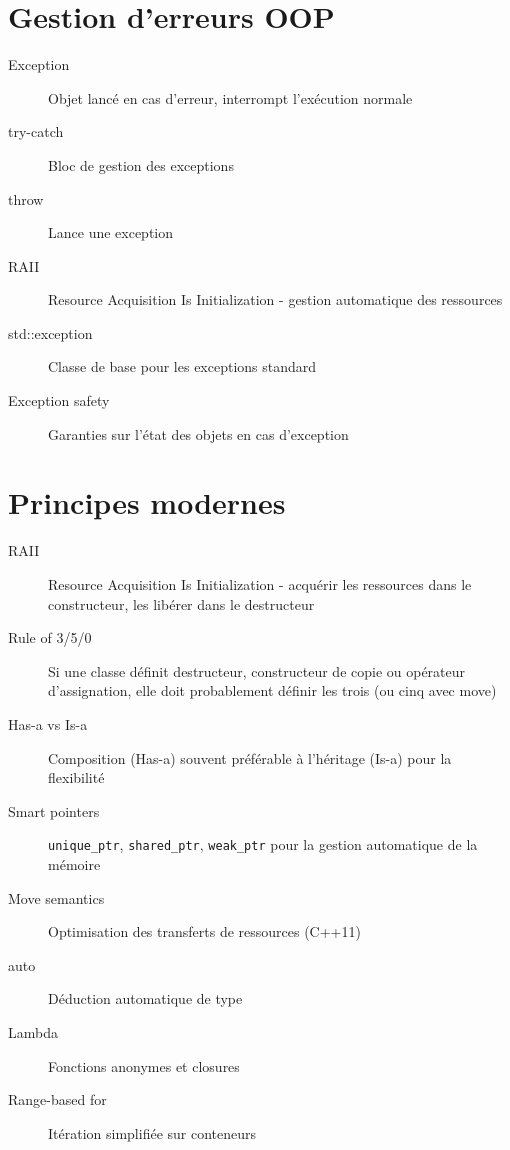 \documentclass{article}
\begin{document}
\begin{multicols*}{3}
\section*{Gestion d'erreurs OOP}
\begin{description}
\item[Exception] Objet lancé en cas d'erreur, interrompt l'exécution normale
\item[try-catch] Bloc de gestion des exceptions
\item[throw] Lance une exception
\item[RAII] Resource Acquisition Is Initialization - gestion automatique des ressources
\item[std::exception] Classe de base pour les exceptions standard
\item[Exception safety] Garanties sur l'état des objets en cas d'exception
\end{description}

\section*{Principes modernes}
\begin{description}
\item[RAII] Resource Acquisition Is Initialization - acquérir les ressources dans le constructeur, les libérer dans le destructeur
\item[Rule of 3/5/0] Si une classe définit destructeur, constructeur de copie ou opérateur d'assignation, elle doit probablement définir les trois (ou cinq avec move)
\item[Has-a vs Is-a] Composition (Has-a) souvent préférable à l'héritage (Is-a) pour la flexibilité
\item[Smart pointers] \texttt{unique\_ptr}, \texttt{shared\_ptr}, \texttt{weak\_ptr} pour la gestion automatique de la mémoire
\item[Move semantics] Optimisation des transferts de ressources (C++11)
\item[auto] Déduction automatique de type
\item[Lambda] Fonctions anonymes et closures
\item[Range-based for] Itération simplifiée sur conteneurs
\end{description}


\end{multicols*}
\end{document}
